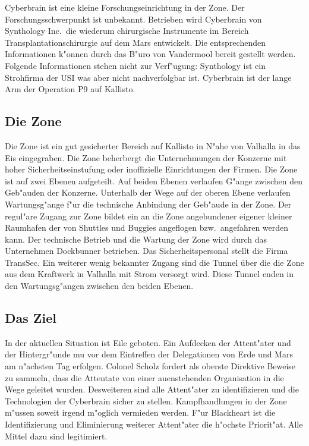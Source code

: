 
Cyberbrain ist eine kleine Forschungseinrichtung in der Zone. Der Forschungsschwerpunkt ist unbekannt. Betrieben wird Cyberbrain von Synthology Inc.~die wiederum chirurgische Instrumente im Bereich Transplantationschirurgie auf dem Mars entwickelt. Die entsprechenden Informationen k"onnen durch das B"uro von Vandermool bereit gestellt werden. Folgende Informationen stehen nicht zur Verf"ugung: Synthology ist ein Strohfirma der USI was aber nicht nachverfolgbar ist. Cyberbrain ist der lange Arm der Operation P9 auf Kallisto.

\subsection{Die Zone}
Die Zone ist ein gut gesicherter Bereich auf Kallisto in N"ahe von Valhalla in das Eis eingegraben. Die Zone beherbergt die Unternehmungen der Konzerne mit hoher Sicherheitseinstufung oder inoffizielle Einrichtungen der Firmen. Die Zone ist auf zwei Ebenen aufgeteilt. Auf beiden Ebenen verlaufen G"ange zwischen den Geb"auden der Konzerne. Unterhalb der Wege auf der oberen Ebene verlaufen Wartungsg"ange f"ur die technische Anbindung der Geb"aude in der Zone. Der regul"are Zugang zur Zone bildet ein an die Zone angebundener eigener kleiner Raumhafen der von Shuttles und Buggies angeflogen bzw.~angefahren werden kann. Der technische Betrieb und die Wartung der Zone wird durch das Unternehmen Dockbunner betrieben. Das Sicherheitspersonal stellt die Firma TransSec. Ein weiterer wenig bekannter Zugang sind die Tunnel über die die Zone aus dem Kraftwerk in Valhalla mit Strom versorgt wird. Diese Tunnel enden in den Wartungsg"angen zwischen den beiden Ebenen.

\subsection{Das Ziel} 
In der aktuellen Situation ist Eile geboten. Ein Aufdecken der Attent"ater und der Hintergr"unde mu\3 vor dem Eintreffen der Delegationen von Erde und Mars am n"achsten Tag erfolgen. Colonel Scholz fordert als oberste Direktive Beweise zu sammeln, dass die Attentate von einer au\3enstehenden Organisation in die Wege geleitet wurden. Desweiteren sind alle Attent"ater zu identifizieren und die Technologien der Cyberbrain sicher zu stellen. Kampfhandlungen in der Zone m"ussen soweit irgend m"oglich vermieden werden. F"ur Blackheart ist die Identifizierung und Eliminierung weiterer Attent"ater die h"ochste Priorit"at. Alle Mittel dazu sind legitimiert. 

